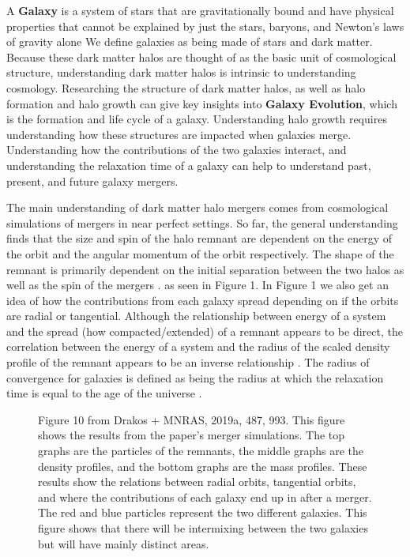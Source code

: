 \documentclass[linenumbers,trackchanges,twocolumn]{aastex7}
\begin{document}
A \textbf{Galaxy} is a system of stars that are gravitationally bound and have physical properties that cannot be explained by just the stars, baryons, and Newton's laws of gravity alone \cite{Willman_Strader_2012} We define galaxies as being made of stars and dark matter. Because these dark matter halos are thought of as the basic unit of cosmological structure, understanding dark matter halos is intrinsic to understanding cosmology. Researching the structure of dark matter halos, as well as halo formation and halo growth can give key insights into \textbf{Galaxy Evolution}, which is the formation and life cycle of a galaxy. Understanding halo growth requires understanding how these structures are impacted when galaxies merge. Understanding how the contributions of the two galaxies interact, and understanding the relaxation time of a galaxy can help to understand past, present, and future galaxy mergers. 

The main understanding of dark matter halo mergers comes from cosmological simulations of mergers in near perfect settings. So far, the general understanding finds that the size  and spin of the halo remnant are dependent on the energy of the orbit and the angular momentum of the orbit respectively. The shape of the remnant is primarily dependent on the initial separation between the two halos as well as the spin of the mergers \cite{2019MNRAS.487..993D}. as seen in Figure 1. In Figure 1 we also get an idea of how the contributions from each galaxy spread depending on if the orbits are radial or tangential. Although the relationship between energy of a system and the spread (how compacted/extended) of a remnant appears to be direct, the correlation between the energy of a system and the radius of the scaled density profile of the remnant appears to be an inverse relationship \cite{2019MNRAS.487.1008D}. The radius of convergence for galaxies is defined as being the radius at which the relaxation time is equal to the age of the universe \cite{2004MNRAS.349.1039N}. 

\begin{figure}[ht!]
\caption{Figure 10 from Drakos + MNRAS, 2019a, 487, 993. This figure shows the results from the paper's merger simulations. The top graphs are the particles of the remnants, the middle graphs are the density profiles, and the bottom graphs are the mass profiles. These results show the relations between radial orbits, tangential orbits, and where the contributions of each galaxy end up in after a merger. The red and blue particles represent the two different galaxies. This figure shows that there will be intermixing between the two galaxies but will have mainly distinct areas.
\label{fig:general}}
\end{figure}
\end{document}
